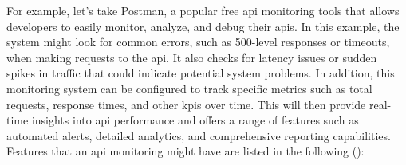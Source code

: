 For example, let's take Postman, a popular free \acrshort{api} monitoring tools that allows developers to easily
monitor, analyze, and debug their \acrshort{api}s. In this example, the system might look for common errors, such
as 500-level responses or timeouts, when making requests to the \acrshort{api}. It also checks for latency issues
or sudden spikes in traffic that could indicate potential system problems. In addition, this monitoring system can
be configured to track specific metrics such as total requests, response times, and other \acrshort{kpi}s over time.
This will then provide real-time insights into \acrshort{api} performance and offers a range of features such as
automated alerts, detailed analytics, and comprehensive reporting capabilities. Features that an \acrshort{api}
monitoring might have are listed in the following (\cite{postmanapimonitoring}):
